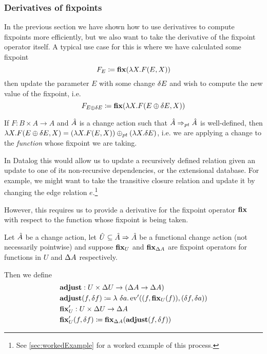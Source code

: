 \subsubsection{Derivatives of fixpoints}
\label{sec:fixpointDerivatives}

In the previous section we have shown how to use derivatives to compute fixpoints
more efficiently, but we also want to take the derivative of the fixpoint
operator itself. A typical use case for this is where we have calculated some fixpoint
\begin{displaymath}
  F_{E} \coloneqq \mathbf{fix} (\lambda X . F(E, X))
\end{displaymath}
then update the parameter $E$ with some change $\delta E$ and wish to compute the new
value of the fixpoint, i.e.
\begin{displaymath}
  F_{E \oplus \delta E} \coloneqq \mathbf{fix} (\lambda X . F(E \oplus \delta E, X))
\end{displaymath}

If $F : B \times A \rightarrow A$ and $\hat{A}$ is a change action such that 
$\hat{A} \Rightarrow_{pt} \hat{A}$ is well-defined, then 
$\lambda X . F(E \oplus \delta E, X) = (\lambda X . F(E, X)) \oplus_{pt} (\lambda X . \delta E)$,
i.e. we are applying a change to the \emph{function} whose fixpoint we are taking.

In Datalog this would allow us to update a recursively defined relation given an
update to one of its non-recursive dependencies, or the extensional database.
For example, we might want to take the transitive closure relation
and update it by changing the edge relation $e$.\footnote{See
  \cref{sec:workedExample} for a worked example of this process.}

However, this requires us to provide a derivative for the fixpoint operator
$\mathbf{fix}$ with respect to the function whose fixpoint is being taken.

\begin{defn}
\label{def:fixpointDerivatives}
  Let $\hat{A}$ be a change action, let $\hat{U} \subseteq \hat{A} \Rightarrow \hat{A}$ be a functional
  change action (not necessarily pointwise) and suppose $\mathbf{fix}_U$ and $\mathbf{fix}_{\Delta A}$ are fixpoint
  operators for functions in $U$ and $\Delta A$ respectively.
  
  Then we define
  \begin{align*}
    &\mathbf{adjust} : U \times \Delta U \rightarrow (\Delta A \rightarrow \Delta A)\\
    &\mathbf{adjust}(f, \delta f) \coloneqq \lambda\ \delta a . \operatorname{ev}'((f, \mathbf{fix}_U(f)), (\delta f, \delta a))\\
    &\mathbf{fix}_U' : U \times \Delta U \rightarrow \Delta A\\
    &\mathbf{fix}_U'(f, \delta f) \coloneqq \mathbf{fix}_{\Delta A}(\mathbf{adjust}(f, \delta f))
  \end{align*}
\end{defn}


